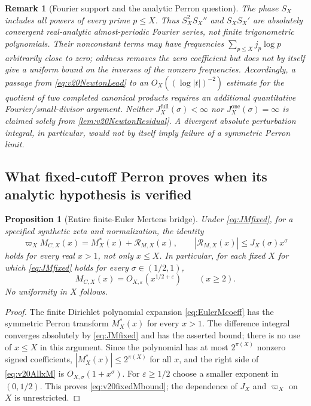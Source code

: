 \documentclass[11pt,reqno]{amsart}
\numberwithin{equation}{section}
\newtheorem{proposition}[theorem]{Proposition}
\newtheorem{remark}[theorem]{Remark}
\begin{document}
\begin{remark}[Fourier support and the analytic Perron question]
\label{rem:v20NotFiniteFourier}
The phase $S_X$ includes \emph{all} powers of every prime $p\le X$.
Thus $S_X^2S_X''$ and $S_XS_X'$ are absolutely convergent
real-analytic almost-periodic Fourier series, \emph{not} finite
trigonometric polynomials.  Their nonconstant terms may have
frequencies $\sum_{p\le X}j_p\log p$ arbitrarily close to zero;
oddness removes the zero coefficient but does not by itself give a
uniform bound on the inverses of the nonzero frequencies.
Accordingly, a passage from \eqref{eq:v20NewtonLead} to an
$O_X((\log|t|)^{-2})$ estimate for the quotient of two completed
canonical products requires an additional quantitative
Fourier/small-divisor argument.  Neither
$J_X^{\mathrm{full}}(\sigma)<\infty$ nor
$J_X^{\mathrm{one}}(\sigma)=\infty$ is claimed solely from
\cref{lem:v20NewtonResidual}.  A divergent absolute perturbation
integral, in particular, would not by itself imply failure of a
\emph{symmetric} Perron limit.
\end{remark}

\subsection{What fixed-cutoff Perron proves when its analytic
hypothesis is verified}
\begin{proposition}[Entire finite-Euler Mertens bridge]
\label{prop:v20AllxM}
Under \eqref{eq:JMfixed}, for a specified synthetic zeta and
normalization, the identity
\begin{equation}\label{eq:v20AllxM}
\varpi_XM_{C,X}(x)=M_X^*(x)+\mathcal R_{M,X}(x),\qquad
|\mathcal R_{M,X}(x)|\le J_X(\sigma)x^\sigma
\end{equation}
holds for \emph{every} real $x>1$, not only $x\le X$.
In particular, for each fixed $X$ for which \eqref{eq:JMfixed}
holds for every $\sigma\in(1/2,1)$,
\begin{equation}\label{eq:v20fixedMbound}
M_{C,X}(x)=O_{X,\varepsilon}(x^{1/2+\varepsilon})
\qquad(x\ge2).
\end{equation}
No uniformity in $X$ follows.
\end{proposition}
\begin{proof}
The finite Dirichlet polynomial expansion
\eqref{eq:EulerMcoeff} has the symmetric Perron transform
$M_X^*(x)$ for every $x>1$.  The difference integral converges
absolutely by \eqref{eq:JMfixed} and has the asserted bound;
there is no use of $x\le X$ in this argument.  Since the polynomial
has at most $2^{\pi(X)}$ nonzero signed coefficients,
$|M_X^*(x)|\le2^{\pi(X)}$ for all $x$, and the right side of
\eqref{eq:v20AllxM} is $O_{X,\sigma}(1+x^\sigma)$.
For $\varepsilon\ge1/2$ choose a smaller exponent in $(0,1/2)$.
This proves \eqref{eq:v20fixedMbound}; the dependence of
$J_X$ and $\varpi_X$ on $X$ is unrestricted.
\end{proof}
\end{document}

